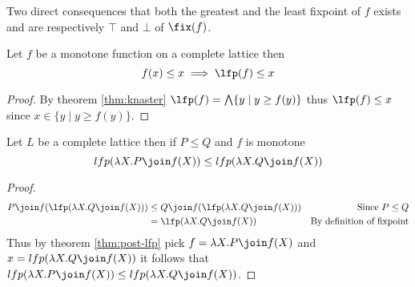 Two direct consequences that both the greatest and the least fixpoint of
$f$ exists and are respectively $\top$ and $\bot$ of $\fix(f)$.

\begin{theorem}
  \label{thm:post-lfp}
  Let $f$ be a monotone function on a complete lattice then
  $$f(x) \leq x \implies \lfp(f) \leq x$$
\end{theorem}
\begin{proof}
  By theorem \ref{thm:knaster} $\lfp(f) = \bigwedge\{ y \mid y \geq f(y) \}$
  thus $\lfp(f) \leq x$ since $x \in \{ y \mid y \geq f(y) \}$.
\end{proof}

\begin{theorem}
  \label{thm:lfp-mono}
  Let $L$ be a complete lattice then if $P \leq Q$ and $f$ is monotone
  $$lfp(\lambda X. P \join f(X)) \leq lfp(\lambda X. Q \join f(X))$$
\end{theorem}
\begin{proof}
  \begin{align*}
    P \join f(\lfp(\lambda X . Q \join f(X)))
      &\leq Q \join f(\lfp(\lambda X . Q \join f(X)))
      &\text{Since $P \leq Q$} \\
      &= \lfp(\lambda X . Q \join f(X))
      &\text{By definition of fixpoint} \\
  \end{align*}
  Thus by theorem \ref{thm:post-lfp} pick $f = \lambda X . P \join f(X)$ and
  $x = lfp(\lambda X. Q \join f(X))$ it follows that
  $lfp(\lambda X. P \join f(X)) \leq lfp(\lambda X. Q \join f(X))$.
\end{proof}

